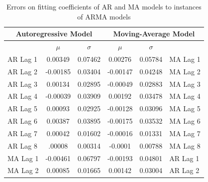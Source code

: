 \documentclass[oneside,12pt,openany]{book}
\begin{document}
	
	\begin{table}[!ht]
		\centering
		\begin{tabular}{|l|c|c|c|c|l|}
			\hline
			\multicolumn{3}{|c|}{\textbf{Autoregressive Model}}   & \multicolumn{3}{c|}{\textbf{Moving-Average Model}}     \\ \hline
			\cellcolor{black} & $\mu$ & $\sigma$ & $\mu$ & $\sigma$ & \cellcolor{black}         \\ \hline
			AR Lag 1 & 0.00349                  & 0.07462                    & 0.00276                  & 0.05784                    & MA Lag 1 \\ \hline
			AR Lag 2 & -0.00185                 & 0.03404                    & -0.00147                 & 0.04248                    & MA Lag 2 \\ \hline
			AR Lag 3 & 0.00134                  & 0.02895                    & -0.00049                 & 0.02883                    & MA Lag 3 \\ \hline
			AR Lag 4 & -0.00039                 & 0.03909                    & 0.00192                  & 0.03478                    & MA Lag 4 \\ \hline
			AR Lag 5 & 0.00093                  & 0.02925                    & -0.00128                 & 0.03096                    & MA Lag 5 \\ \hline
			AR Lag 6 & 0.00387                  & 0.03895                    & -0.00175                 & 0.03532                    & MA Lag 6 \\ \hline
			AR Lag 7 & 0.00042                  & 0.01602                    & -0.00016                 & 0.01331                    & MA Lag 7 \\ \hline
			AR Lag 8 & .00008                   & 0.00314                    & -0.0001                  & 0.00788                    & MA Lag 8 \\ \hline
			MA Lag 1 & -0.00461                 & 0.06797                    & -0.00193                 & 0.04801                    & AR Lag 1 \\ \hline
			MA Lag 2 & 0.00085                  & 0.01665                    & 0.00142                  & 0.03004                    & AR Lag 2 \\ \hline
		\end{tabular}
		\caption{Errors on fitting coefficients of AR and MA models to instances of ARMA models}
	\end{table}
\end{document}
